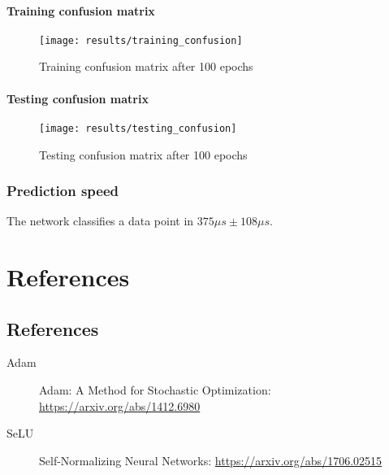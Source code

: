 \subsection{Training confusion matrix}
\begin{figure}
	\texttt{[image: results/training\_confusion]}
	\caption{Training confusion matrix after 100 epochs}
\end{figure}

\subsection{Testing confusion matrix}
\begin{figure}
	\texttt{[image: results/testing\_confusion]}
	\caption{Testing confusion matrix after 100 epochs}
\end{figure}

\section{Prediction speed}
The network classifies a data point in \(375 \mu s \pm 108 \mu s\).

\part{References}

\chapter{References}

\begin{description}
	\item[Adam] Adam: A Method for Stochastic Optimization: \url{https://arxiv.org/abs/1412.6980} \label{adam}
	\item[SeLU] Self-Normalizing Neural Networks: \url{https://arxiv.org/abs/1706.02515} \label{selu}
\end{description}



